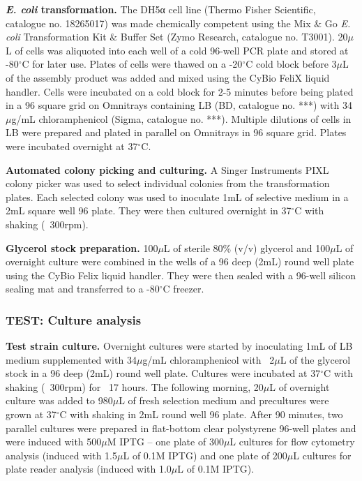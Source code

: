 \textbf{\textit{E. coli} transformation.}
The DH5α cell line (Thermo Fisher Scientific, catalogue no. 18265017) was made chemically competent using the Mix $\&$ Go \textit{E. coli} Transformation Kit $\&$ Buffer Set (Zymo Research, catalogue no. T3001).
20$\mu$L of cells was aliquoted into each well of a cold 96-well PCR plate and stored at -80$^{\circ}$C for later use.
Plates of cells were thawed on a -20$^{\circ}$C cold block before 3$\mu$L of the assembly product was added and mixed using the CyBio FeliX liquid handler.
Cells were incubated on a cold block for 2-5 minutes before being plated in a 96 square grid on Omnitrays containing LB (BD, catalogue no. ***) with 34$\mu$g/mL chloramphenicol (Sigma, catalogue no. ***).
Multiple dilutions of cells in LB were prepared and plated in parallel on Omnitrays in 96 square grid. Plates were incubated overnight at 37$^{\circ}$C.

\textbf{Automated colony picking and culturing.}
A Singer Instruments PIXL colony picker was used to select individual colonies from the transformation plates.
Each selected colony was used to inoculate 1mL of selective medium in a 2mL square well 96 plate.
They were then cultured overnight in 37$^{\circ}$C with shaking (~300rpm).

\textbf{Glycerol stock preparation.}
100$\mu$L of sterile 80\% (v/v) glycerol and 100$\mu$L of overnight culture were combined in the wells of a 96 deep (2mL) round well plate using the CyBio Felix liquid handler.
They were then sealed with a 96-well silicon sealing mat and transferred to a -80$^{\circ}$C freezer. 

\subsubsection{TEST: Culture analysis}

\textbf{Test strain culture.}
Overnight cultures were started by inoculating 1mL of LB medium supplemented with 34$\mu$g/mL chloramphenicol with ~2$\mu$L of the glycerol stock in a 96 deep (2mL) round well plate.
Cultures were incubated at 37$^{\circ}$C with shaking (~300rpm) for ~17 hours. The following morning, 20$\mu$L of overnight culture was added to 980$\mu$L of fresh selection medium and precultures were grown at 37$^{\circ}$C with shaking in 2mL round well 96 plate. 
After 90 minutes, two parallel cultures were prepared in flat-bottom clear polystyrene 96-well plates and were induced with 500$\mu$M IPTG – one plate of 300$\mu$L cultures for flow cytometry analysis (induced with 1.5$\mu$L of 0.1M IPTG) and one plate of 200$\mu$L cultures for plate reader analysis (induced with 1.0$\mu$L of 0.1M IPTG).


